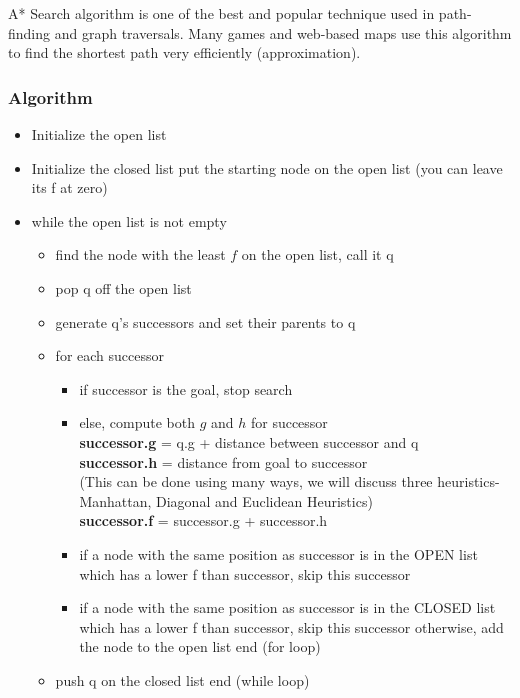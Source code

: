 A* Search algorithm is one of the best and popular technique used in path-finding and graph traversals.
Many games and web-based maps use this algorithm to find the shortest path very efficiently (approximation).

\subsubsection*{Algorithm}

\begin{itemize}
      \item Initialize the open list
      \item Initialize the closed list put the starting node on the open list (you can leave its f at zero)
      \item while the open list is not empty
            \begin{itemize}
                  \item find the node with the least $f$ on the open list, call it q
                  \item pop q off the open list
                  \item generate q's successors and set their parents to q
                  \item for each successor
                        \begin{itemize}
                              \item if successor is the goal, stop search
                              \item else, compute both $g$ and $h$ for successor \\
                                    \textbf{successor.g} = q.g + distance between successor and q \\
                                    \textbf{successor.h} = distance from goal to successor \\
                                    (This can be done using many ways, we will discuss
                                    three heuristics- Manhattan, Diagonal and Euclidean Heuristics) \\
                                    \textbf{successor.f} = successor.g + successor.h
                              \item if a node with the same position as successor is in the OPEN list
                                    which has a lower f than successor, skip this successor
                              \item if a node with the same position as successor is in the CLOSED
                                    list which has a lower f than successor, skip this successor
                                    otherwise, add the node to the open list end (for loop)
                        \end{itemize}
                  \item push q on the closed list end (while loop)
            \end{itemize}
\end{itemize}

